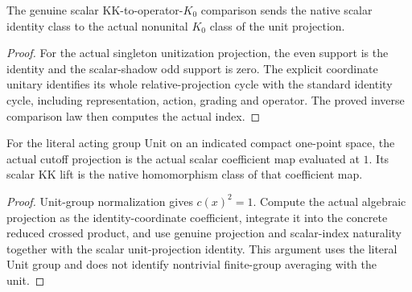 \begin{proposition}\label{prop:scalar-unit-projection-identity}
\leanok
The genuine scalar KK-to-operator-$K_0$ comparison sends the native scalar
identity class to the actual nonunital $K_0$ class of the unit projection.
\end{proposition}
\begin{proof}
\leanok
For the actual singleton unitization projection, the even support is the
identity and the scalar-shadow odd support is zero. The explicit coordinate
unitary identifies its whole relative-projection cycle with the standard
identity cycle, including representation, action, grading and operator.
The proved inverse comparison law then computes the actual index.
\end{proof}

\begin{proposition}\label{prop:unit-point-cutoff-hom-class}
\leanok
For the literal acting group $\mathrm{Unit}$ on an indicated compact
one-point space, the actual cutoff projection is the actual scalar
coefficient map evaluated at $1$. Its scalar KK lift is the native
homomorphism class of that coefficient map.
\end{proposition}
\begin{proof}
\leanok
Unit-group normalization gives $c(x)^2=1$. Compute the actual algebraic
projection as the identity-coordinate coefficient, integrate it into the
concrete reduced crossed product, and use genuine projection and scalar-index
naturality together with the scalar unit-projection identity. This argument
uses the literal Unit group and does not identify nontrivial finite-group
averaging with the unit.
\end{proof}

